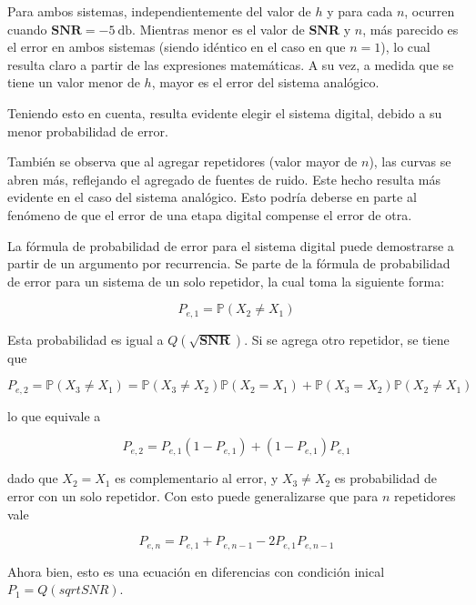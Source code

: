Para ambos sistemas, independientemente del valor de $h$ y para cada $n$, ocurren cuando $\textbf{SNR}=\SI{-5}{\decibel}$. Mientras menor es el valor de \textbf{SNR} y $n$, más parecido es el error en ambos sistemas (siendo idéntico en el caso en que $n=1$), lo cual resulta claro a partir de las expresiones matemáticas. A su vez, a medida que se tiene un valor menor de $h$, mayor es el error del sistema analógico. 

Teniendo esto en cuenta, resulta evidente elegir el sistema digital, debido a su menor probabilidad de error.

También se observa que al agregar repetidores (valor mayor de $n$), las curvas se abren más, reflejando el agregado de fuentes de ruido. Este hecho resulta más evidente en el caso del sistema analógico. Esto podría deberse en parte al fenómeno de que el error de una etapa digital compense el error de otra. 

La fórmula de probabilidad de error para el sistema digital puede demostrarse a partir de un argumento por recurrencia. Se parte de la fórmula de probabilidad de error para un sistema de un solo repetidor, la cual toma la siguiente forma:

\begin{equation}
P_{e,1}=\mathbb{P}(X_2\neq X_1) 
\end{equation} 

Esta probabilidad es igual a $Q(\sqrt{\textbf{SNR}})$. Si se agrega otro repetidor, se tiene que

\begin{equation}
P_{e,2}=\mathbb{P}(X_3\neq X_1)=\mathbb{P}(X_3\neq X_2)\mathbb{P}(X_2 = X_1)+\mathbb{P}(X_3 = X_2)\mathbb{P}(X_2\neq X_1)
\end{equation} 

lo que equivale a 

\begin{equation}
P_{e,2}=P_{e,1}(1-P_{e,1})+(1-P_{e,1})P_{e,1}
\end{equation} 

dado que $X_2 = X_1$ es complementario al error, y $X_3 \neq X_2$ es probabilidad de error con un solo repetidor. Con esto puede generalizarse que para $n$ repetidores vale

\begin{equation}
P_{e,n}=P_{e,1}+P_{e,n-1}-2P_{e,1}P_{e,n-1}
\end{equation} 

Ahora bien, esto es una ecuación en diferencias con condición inical $P_1 = Q(sqrt{SNR})$. 

